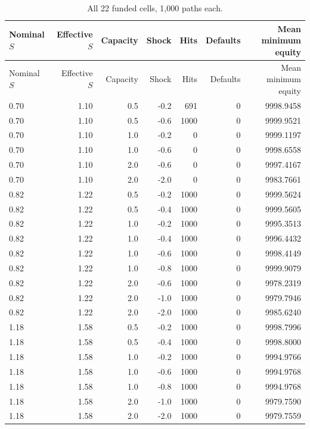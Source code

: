 \documentclass[10pt]{article}
\begin{document}
\small\setlength{\tabcolsep}{3pt}
\begin{longtable}{lrrrrrr}
\caption{All 22 funded cells, 1,000 paths each.}\label{tab:all_funded_replays}\\
\toprule
Nominal $S$ & Effective $S$ & Capacity & Shock & Hits & Defaults & Mean minimum equity \\\midrule\endfirsthead
\toprule
Nominal $S$ & Effective $S$ & Capacity & Shock & Hits & Defaults & Mean minimum equity \\\midrule\endhead
0.70 & 1.10 & 0.5 & -0.2 & 691 & 0 & 9998.9458 \\
0.70 & 1.10 & 0.5 & -0.6 & 1000 & 0 & 9999.9521 \\
0.70 & 1.10 & 1.0 & -0.2 & 0 & 0 & 9999.1197 \\
0.70 & 1.10 & 1.0 & -0.6 & 0 & 0 & 9998.6558 \\
0.70 & 1.10 & 2.0 & -0.6 & 0 & 0 & 9997.4167 \\
0.70 & 1.10 & 2.0 & -2.0 & 0 & 0 & 9983.7661 \\
0.82 & 1.22 & 0.5 & -0.2 & 1000 & 0 & 9999.5624 \\
0.82 & 1.22 & 0.5 & -0.4 & 1000 & 0 & 9999.5605 \\
0.82 & 1.22 & 1.0 & -0.2 & 1000 & 0 & 9995.3513 \\
0.82 & 1.22 & 1.0 & -0.4 & 1000 & 0 & 9996.4432 \\
0.82 & 1.22 & 1.0 & -0.6 & 1000 & 0 & 9998.4149 \\
0.82 & 1.22 & 1.0 & -0.8 & 1000 & 0 & 9999.9079 \\
0.82 & 1.22 & 2.0 & -0.6 & 1000 & 0 & 9978.2319 \\
0.82 & 1.22 & 2.0 & -1.0 & 1000 & 0 & 9979.7946 \\
0.82 & 1.22 & 2.0 & -2.0 & 1000 & 0 & 9985.6240 \\
1.18 & 1.58 & 0.5 & -0.2 & 1000 & 0 & 9998.7996 \\
1.18 & 1.58 & 0.5 & -0.4 & 1000 & 0 & 9998.8000 \\
1.18 & 1.58 & 1.0 & -0.2 & 1000 & 0 & 9994.9766 \\
1.18 & 1.58 & 1.0 & -0.6 & 1000 & 0 & 9994.9768 \\
1.18 & 1.58 & 1.0 & -0.8 & 1000 & 0 & 9994.9768 \\
1.18 & 1.58 & 2.0 & -1.0 & 1000 & 0 & 9979.7590 \\
1.18 & 1.58 & 2.0 & -2.0 & 1000 & 0 & 9979.7559 \\
\bottomrule\end{longtable}\normalsize
\end{document}

